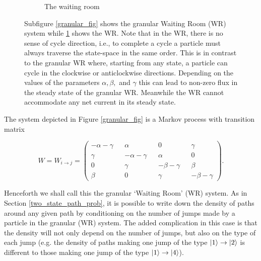 \begin{figure}
\begin{subfigure}[b]{0.49\textwidth}
  \caption{The waiting room}
  \label{coarse_grained_fig}
\end{subfigure}
\caption{\footnotesize Subfigure \ref{granular_fig} shows the granular Waiting Room (WR) system while \ref{coarse_grained_fig} shows the WR. Note that in the WR, there is no sense of cycle direction, i.e., to complete a cycle a particle must always traverse the state-space in the same order. This is in contrast to the granular WR where, starting from any state, a particle can cycle in the clockwise or anticlockwise directions. Depending on the values of the parameters $\alpha,\beta,$ and $\gamma$ this can lead to non-zero flux in the steady state of the granular WR. Meanwhile the WR cannot accommodate any net current in its steady state.}
\label{system_desc_fig}
\end{figure}

The system depicted in Figure \ref{granular_fig} is a Markov process with transition matrix

\begin{equation}
  W = W_{i \rightarrow j} = \begin{pmatrix}-\alpha - \gamma && \alpha && 0 && \gamma \\
\gamma && -\alpha - \gamma && \alpha && 0 \\
0 && \gamma && -\beta-\gamma && \beta \\
\beta && 0 && \gamma && -\beta - \gamma \end{pmatrix}.
\end{equation}

Henceforth we shall call this the granular `Waiting Room' (WR) system. As in Section \ref{two_state_path_prob}, it is possible to write down the density of paths around any given path by conditioning on the number of jumps made by a particle in the granular (WR) system. The added complication in this case is that the density will not only depend on the number of jumps, but also on the type of each jump (e.g. the density of paths making one jump of the type $\ket{1} \rightarrow \ket{2}$ is different to those making one jump of the type $\ket{1} \rightarrow \ket{4}$).

